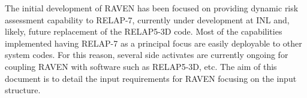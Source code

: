 The initial development of RAVEN has been focused on providing dynamic risk 
assessment capability to RELAP-7, currently under development at INL and,
likely, future replacement of the RELAP5-3D code.
%
Most of the capabilities implemented having RELAP-7 as a principal focus are
easily deployable to other system codes.
%
For this reason, several side activates are currently ongoing for coupling RAVEN
with software such as RELAP5-3D, etc.
%
The aim of this document is to detail the input requirements for RAVEN focusing
on the input structure.
